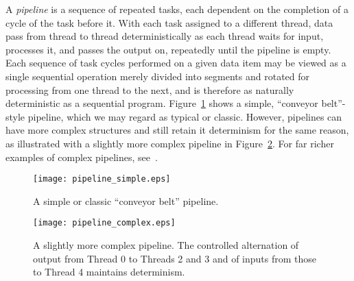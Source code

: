 A \textit{pipeline} is a sequence of repeated tasks, each dependent on the completion of a cycle of the task before it.  With each task assigned to a different thread, data pass from thread to thread deterministically as each thread waits for input, processes it, and passes the output on, repeatedly until the pipeline is empty.  Each sequence of task cycles performed on a given data item may be viewed as a single sequential operation merely divided into segments and rotated for processing from one thread to the next, and is therefore as naturally deterministic as a sequential program.  Figure~\ref{fig:design-pipeline-simple} shows a simple, ``conveyor belt''-style pipeline, which we may regard as typical or classic.  However, pipelines can have more complex structures and still retain it determinism for the same reason, as illustrated with a slightly more complex pipeline in 
Figure~\ref{fig:design-pipeline-complex}.  For far richer examples of complex pipelines, see~\cite{edwards08programming}.
%
\begin{figure}
\begin{center}
\texttt{[image: pipeline\_simple.eps]}
\caption{A simple or classic ``conveyor belt'' pipeline.}
\label{fig:design-pipeline-simple}
\end{center}
\end{figure}
%
\begin{figure}
\begin{center}
\texttt{[image: pipeline\_complex.eps]}
\caption{A slightly more complex pipeline.  The controlled alternation of output from Thread 0 to Threads 2 and 3 and of inputs from those to Thread 4 maintains determinism.}
\label{fig:design-pipeline-complex}
\end{center}
\end{figure}

